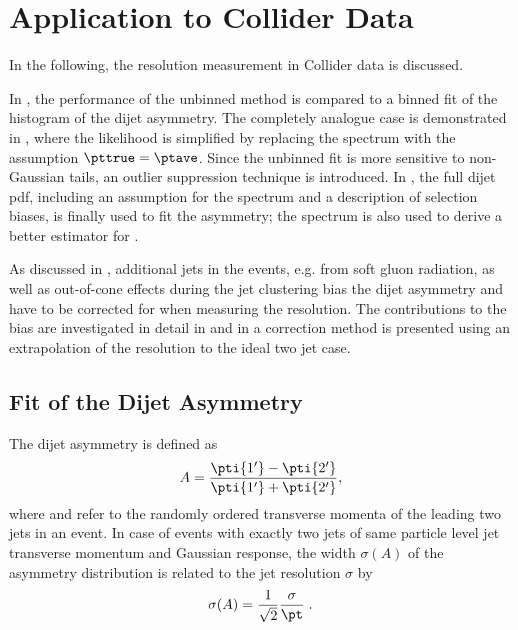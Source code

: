 \section{Application to Collider Data}\label{sec:ResFit:DataDriven}

In the following, the resolution measurement in Collider data is
discussed.

In , the performance of the unbinned
method is compared to a binned fit of the histogram of the dijet asymmetry.
The completely analogue case is demonstrated in
, where the likelihood is simplified by replacing the spectrum
with the assumption \mbox{$\pttrue = \ptave$}.
Since the unbinned fit is more sensitive to non-Gaussian tails, an outlier
suppression technique is introduced.
In , the full dijet pdf, including an assumption for the
spectrum and a description of selection biases, is finally used to fit the asymmetry;
the spectrum is also used to derive a better estimator for \ptgen.

As discussed in , additional jets in the events, e.g. from soft gluon radiation, as
well as out-of-cone effects during the jet clustering bias the dijet asymmetry and have to be
corrected for when measuring the resolution.
The contributions to the bias are investigated in detail in  and
in  a correction method is presented using an extrapolation of
the resolution to the ideal two jet case.


\subsection{Fit of the Dijet Asymmetry}\label{sec:ResFit:DataDriven:Asym}

The dijet asymmetry is defined as
\begin{equation}\label{eq:ResFit:Asymmetry}
  A = \frac{\pti{1'}-\pti{2'}}{\pti{1'}+\pti{2'}},
\end{equation}
where  and  refer to the randomly ordered transverse momenta of the
leading two jets in an event.
In case of events with exactly two jets of same particle level jet
transverse momentum \pt and Gaussian response, the width $\sigma(A)$ of the asymmetry distribution is
related to the jet \pt resolution $\sigma$ by
\begin{equation}
  \label{eq:ResFit:ResFromAsym}
  \sigma(A) = \frac{1}{\sqrt{2}}\frac{\sigma}{\pt} \; .
\end{equation}


